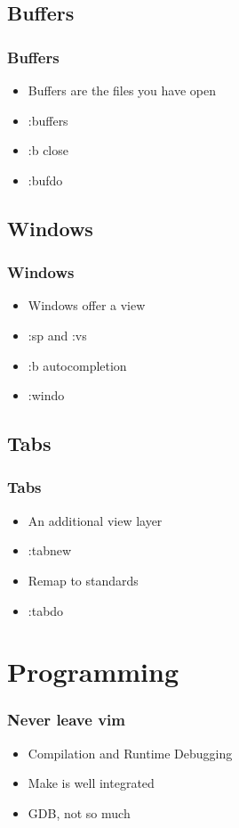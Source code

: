 \documentclass{beamer}
\begin{document}
\subsection{Buffers}
\frame
{
    \frametitle{Buffers}

    \begin{itemize}
        \item Buffers are the files you have open
        \item :buffers
        \item :b close
        \item :bufdo
    \end{itemize}
}

\subsection{Windows}
\frame
{
    \frametitle{Windows}

    \begin{itemize}
        \item Windows offer a view
        \item :sp and :vs
        \item :b autocompletion
        \item :windo
    \end{itemize}
}

\subsection{Tabs}
\frame
{
    \frametitle{Tabs}

    \begin{itemize}
        \item An additional view layer
        \item :tabnew
        \item Remap to standards
        \item :tabdo
    \end{itemize}
}

\section{Programming}
\frame
{
    \frametitle{Never leave vim}

    \begin{itemize}
        \item Compilation and Runtime Debugging
        \item Make is well integrated
        \item GDB, not so much
    \end{itemize}
}
\end{document}
